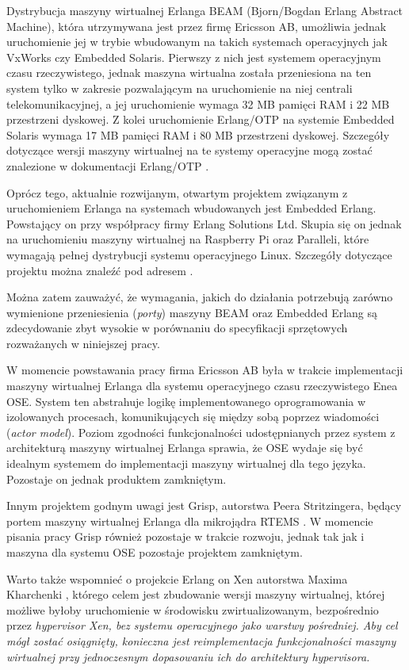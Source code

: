 Dystrybucja maszyny wirtualnej Erlanga BEAM (Bjorn/Bogdan Erlang Abstract Machine), która utrzymywana jest przez firmę Ericsson AB, umożliwia jednak uruchomienie jej w trybie wbudowanym na takich systemach operacyjnych jak VxWorks czy Embedded Solaris. Pierwszy z nich jest systemem operacyjnym czasu rzeczywistego, jednak maszyna wirtualna została przeniesiona na ten system tylko w zakresie pozwalającym na uruchomienie na niej centrali telekomunikacyjnej, a jej uruchomienie wymaga 32 MB pamięci RAM i 22 MB przestrzeni dyskowej.
Z kolei uruchomienie Erlang/OTP na systemie Embedded Solaris wymaga 17 MB pamięci RAM i 80 MB przestrzeni dyskowej.
Szczegóły dotyczące wersji maszyny wirtualnej na te systemy operacyjne mogą zostać znalezione w dokumentacji Erlang/OTP \cite{ErlangVxWorks}.


Oprócz tego, aktualnie rozwijanym, otwartym projektem związanym z uruchomieniem Erlanga na systemach wbudowanych jest Embedded Erlang. Powstający on przy współpracy firmy Erlang Solutions Ltd. Skupia się on jednak na uruchomieniu maszyny wirtualnej na Raspberry Pi oraz Paralleli, które wymagają pełnej dystrybucji systemu operacyjnego Linux. Szczegóły dotyczące projektu można znaleźć pod adresem \cite{ErlangEmbedded}.


Można zatem zauważyć, że wymagania, jakich do działania potrzebują zarówno wymienione przeniesienia (\emph{porty}) maszyny BEAM oraz Embedded Erlang są zdecydowanie zbyt wysokie w porównaniu do specyfikacji sprzętowych rozważanych w niniejszej pracy.


W momencie powstawania pracy firma Ericsson AB była w trakcie implementacji maszyny wirtualnej Erlanga dla systemu operacyjnego czasu rzeczywistego Enea OSE. System ten abstrahuje logikę implementowanego oprogramowania w izolowanych procesach, komunikujących się między sobą poprzez wiadomości (\emph{actor model}). Poziom zgodności funkcjonalności udostępnianych przez system z architekturą maszyny wirtualnej Erlanga sprawia, że OSE wydaje się być idealnym systemem do implementacji maszyny wirtualnej dla tego języka. Pozostaje on jednak produktem zamkniętym.

Innym projektem godnym uwagi jest Grisp, autorstwa Peera Stritzingera, będący portem maszyny wirtualnej Erlanga dla mikrojądra RTEMS \cite{Stritzinger2013}. W momencie pisania pracy Grisp również pozostaje w trakcie rozwoju, jednak tak jak i maszyna dla systemu OSE pozostaje projektem zamkniętym.

Warto także wspomnieć o projekcie Erlang on Xen autorstwa Maxima Kharchenki \cite{Kharchenko2012}, którego celem jest zbudowanie wersji maszyny wirtualnej, której możliwe byłoby uruchomienie w środowisku zwirtualizowanym, bezpośrednio przez \em{hypervisor} Xen, bez systemu operacyjnego jako warstwy pośredniej. Aby cel mógł zostać osiągnięty, konieczna jest reimplementacja funkcjonalności maszyny wirtualnej przy jednoczesnym dopasowaniu ich do architektury \em{hypervisora}.

